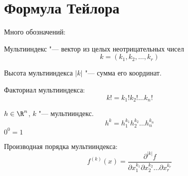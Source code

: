 \section{Формула Тейлора}

Много обозначений:
\begin{Def}
	Мультииндекс "--- вектор из целых неотрицательных чисел
	\[ k = (k_1, k_2, \dots, k_r) \]
\end{Def}

\begin{Def}
	Высота мультииндекса $|k|$ "--- сумма его координат.
\end{Def}

\begin{Def}
	Факториал мультииндекса:
	\[ k! = k_1! k_2! \dots k_n! \]
\end{Def}

\begin{Def}
	$h \in \R^n$, $k$ "--- мультииндекс.
	\[ h^k = h_1^{k_1} h_2^{k_2} \dots h_n^{k_n} \]
	$0^0 = 1$
\end{Def}

\begin{Def}
	Производная порядка мультииндекса:
	\[ f^{(k)}(x) = \frac{\partial^{|k|} f}{\partial x_1^{k_1} \partial x_2^{k_2} \dots \partial x_r^{k_r}} \]
\end{Def}

